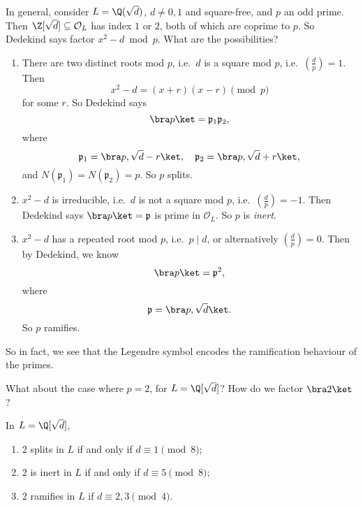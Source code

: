 \documentclass[a4paper]{article}
\begin{document}
In general, consider $L = \Q(\sqrt{d})$, $d \not= 0, 1$ and square-free, and $p$ an odd prime. Then $\Z[\sqrt{d}] \subseteq \mathcal{O}_L$ has index $1$ or $2$, both of which are coprime to $p$. So Dedekind says factor $x^2 - d \bmod p$. What are the possibilities?
\begin{enumerate}
  \item There are two distinct roots mod $p$, i.e.\ $d$ is a square mod $p$, i.e.\ $\left(\frac{d}{p}\right) = 1$. Then
    \[
      x^2 - d = (x + r)(x - r)\pmod p
    \]
    for some $r$. So Dedekind says
    \[
      \bra p\ket = \mathfrak{p}_1 \mathfrak{p}_2,
    \]
    where
    \[
      \mathfrak{p}_1 = \bra p, \sqrt{d} - r\ket,\quad \mathfrak{p}_2 = \bra p, \sqrt{d} + r\ket,
    \]
    and $N(\mathfrak{p}_1) = N(\mathfrak{p}_2) = p$. So $p$ splits.
  \item $x^2 - d$ is irreducible, i.e.\ $d$ is not a square mod $p$, i.e.\ $\left(\frac{d}{p}\right) = -1$. Then Dedekind says $\bra p \ket = \mathfrak{p}$ is prime in $\mathcal{O}_L$. So $p$ is \emph{inert}.
  \item $x^2 - d$ has a repeated root mod $p$, i.e.\ $p \mid d$, or alternatively $\left(\frac{d}{p}\right) = 0$. Then by Dedekind, we know
    \[
      \bra p\ket = \mathfrak{p}^2,
    \]
    where
    \[
      \mathfrak{p} = \bra p, \sqrt{d}\ket.
    \]
    So $p$ ramifies.
\end{enumerate}
So in fact, we see that the Legendre symbol encodes the ramification behaviour of the primes.

What about the case where $p = 2$, for $L = \Q[\sqrt{d}]$? How do we factor $\bra 2\ket$?

\begin{lemma}
  In $L = \Q[\sqrt{d}]$,
  \begin{enumerate}
    \item $2$ splits in $L$ if and only if $d \equiv 1 \pmod 8$;
    \item $2$ is inert in $L$ if and only if $d \equiv 5 \pmod 8$;
    \item $2$ ramifies in $L$ if $d \equiv 2, 3\pmod 4$.
  \end{enumerate}
\end{lemma}
\end{document}
